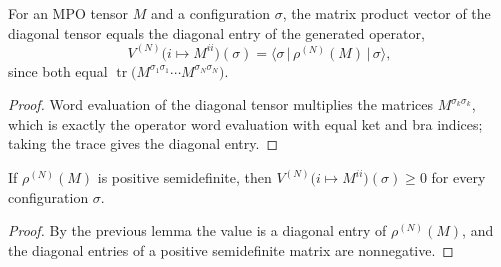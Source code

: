 \begin{lemma}
    \label{lem:mpv_diagonal_tensor_eq_density}
    \leanok
    For an MPO tensor $M$ and a configuration $\sigma$, the matrix product vector of
    the diagonal tensor equals the diagonal entry of the generated operator,
    \[
        V^{(N)}\bigl(i\mapsto M^{ii}\bigr)(\sigma)
        = \bigl\langle\sigma\,\big|\,\rho^{(N)}(M)\,\big|\,\sigma\bigr\rangle,
    \]
    since both equal $\operatorname{tr}\bigl(M^{\sigma_1\sigma_1}\cdots
        M^{\sigma_N\sigma_N}\bigr)$.
\end{lemma}
\begin{proof}\leanok
    Word evaluation of the diagonal tensor multiplies the matrices
    $M^{\sigma_k\sigma_k}$, which is exactly the operator word evaluation with equal
    ket and bra indices; taking the trace gives the diagonal entry.
\end{proof}

\begin{lemma}
    \label{lem:mpv_diagonal_tensor_nonneg}
    \leanok
    If $\rho^{(N)}(M)$ is positive semidefinite, then
    $V^{(N)}\bigl(i\mapsto M^{ii}\bigr)(\sigma)\ge 0$ for every configuration
    $\sigma$.
\end{lemma}
\begin{proof}\leanok
    By the previous lemma the value is a diagonal entry of $\rho^{(N)}(M)$, and the
    diagonal entries of a positive semidefinite matrix are nonnegative.
\end{proof}

